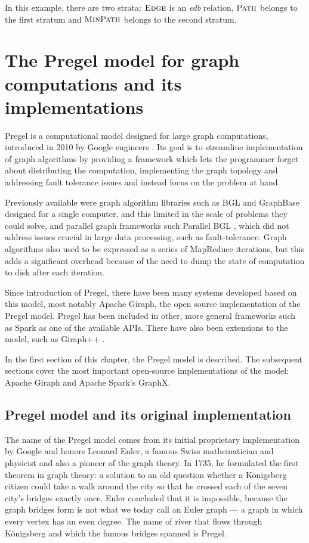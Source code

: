 \documentclass{pracamgr}
\theoremstyle{plain}
\theoremstyle{definition}
\theoremstyle{remark}
\newcommand{\relat}[2]{$\textsc{#1}#2$}
\begin{document}
In this example, there are two strata: \relat{Edge}{} is an \emph{edb} relation, \relat{Path}{} belongs to the first stratum and \relat{MinPath}{} belongs to the second stratum.


\chapter{The Pregel model for graph computations and its implementations}\label{r:pregel}

Pregel is a computational model designed for large graph computations, introduced in 2010 by Google engineers \cite{pregel}. Its goal is to streamline implementation of graph algorithms by providing a framework which lets the programmer forget about distributing the computation, implementing the graph topology and addressing fault tolerance issues and instead focus on the problem at hand.

Previously available were graph algorithm libraries such as BGL\cite{bgl} and GraphBase \cite{GraphBase} designed for a single computer, and this limited in the scale of problems they could solve, and parallel graph frameworks such Parallel BGL \cite{parallelbgl}, which did not address issues crucial in large data processing, such as fault-tolerance. Graph algorithms also used to be expressed as a series of MapReduce iterations, but this adds a significant overhead because of the need to dump the state of computation to disk after each iteration.

Since introduction of Pregel, there have been many systems developed based on this model, most notably Apache Giraph, the open source implementation of the Pregel model. Pregel has been included in other, more general frameworks such as Spark as one of the available APIs. There have also been extensions to the model, such as Giraph++ \cite{giraphpp}.

In the first section of this chapter, the Pregel model is described. The subsequent sections cover the most important open-source implementations of the model: Apache Giraph and Apache Spark's GraphX.

\section{Pregel model and its original implementation}

The name of the Pregel model comes from its initial proprietary implementation by Google and honors Leonard Euler, a famous Swiss mathematician and physicist and also a pioneer of the graph theory. In 1735, he formulated the first theorem in graph theory: a solution to an old question whether a Königsberg citizen could take a walk around the city so that he crossed each of the seven city's bridges exactly once. Euler concluded that it is impossible, because the graph bridges form is not what we today call an Euler graph --- a graph in which every vertex has an even degree. The name of river that flows through Königsberg and which the famous bridges spanned is Pregel.
\end{document}
